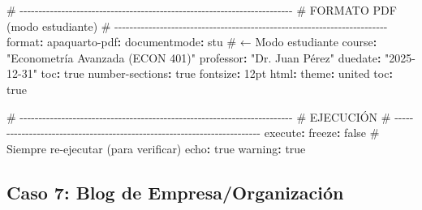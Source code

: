 \documentclass[
  doc,
  floatsintext,
  longtable,
  a4paper,
  nolmodern,
  notxfonts,
  notimes,
  12pt,
  colorlinks=true,linkcolor=blue,citecolor=blue,urlcolor=blue]{apa7}
\newenvironment{Shaded}{\begin{snugshade}}{\end{snugshade}}
\newcommand{\AttributeTok}[1]{\textcolor[rgb]{0.40,0.45,0.13}{#1}}
\newcommand{\CharTok}[1]{\textcolor[rgb]{0.13,0.47,0.30}{#1}}
\newcommand{\CommentTok}[1]{\textcolor[rgb]{0.37,0.37,0.37}{#1}}
\newcommand{\FunctionTok}[1]{\textcolor[rgb]{0.28,0.35,0.67}{#1}}
\newcommand{\KeywordTok}[1]{\textcolor[rgb]{0.00,0.23,0.31}{\textbf{#1}}}
\newcommand{\StringTok}[1]{\textcolor[rgb]{0.13,0.47,0.30}{#1}}
\begin{document}
\begin{Shaded}
\begin{Highlighting}[]
\CommentTok{\# {-}{-}{-}{-}{-}{-}{-}{-}{-}{-}{-}{-}{-}{-}{-}{-}{-}{-}{-}{-}{-}{-}{-}{-}{-}{-}{-}{-}{-}{-}{-}{-}{-}{-}{-}{-}{-}{-}{-}{-}{-}{-}{-}{-}{-}{-}{-}{-}{-}{-}{-}{-}{-}{-}{-}{-}{-}{-}{-}{-}{-}{-}{-}{-}{-}{-}{-}{-}{-}{-}{-}{-}}
\CommentTok{\# FORMATO PDF (modo estudiante)}
\CommentTok{\# {-}{-}{-}{-}{-}{-}{-}{-}{-}{-}{-}{-}{-}{-}{-}{-}{-}{-}{-}{-}{-}{-}{-}{-}{-}{-}{-}{-}{-}{-}{-}{-}{-}{-}{-}{-}{-}{-}{-}{-}{-}{-}{-}{-}{-}{-}{-}{-}{-}{-}{-}{-}{-}{-}{-}{-}{-}{-}{-}{-}{-}{-}{-}{-}{-}{-}{-}{-}{-}{-}{-}{-}}
\FunctionTok{format}\KeywordTok{:}
\AttributeTok{  }\FunctionTok{apaquarto{-}pdf}\KeywordTok{:}
\AttributeTok{    }\FunctionTok{documentmode}\KeywordTok{:}\AttributeTok{ stu}\CommentTok{       \# ← Modo estudiante}
\AttributeTok{    }\FunctionTok{course}\KeywordTok{:}\AttributeTok{ }\StringTok{"Econometría Avanzada (ECON 401)"}
\AttributeTok{    }\FunctionTok{professor}\KeywordTok{:}\AttributeTok{ }\StringTok{"Dr. Juan Pérez"}
\AttributeTok{    }\FunctionTok{duedate}\KeywordTok{:}\AttributeTok{ }\StringTok{"2025{-}12{-}31"}
\AttributeTok{    }\FunctionTok{toc}\KeywordTok{:}\AttributeTok{ }\CharTok{true}
\AttributeTok{    }\FunctionTok{number{-}sections}\KeywordTok{:}\AttributeTok{ }\CharTok{true}
\AttributeTok{    }\FunctionTok{fontsize}\KeywordTok{:}\AttributeTok{ 12pt}
\AttributeTok{    }
\AttributeTok{  }\FunctionTok{html}\KeywordTok{:}
\AttributeTok{    }\FunctionTok{theme}\KeywordTok{:}\AttributeTok{ united}
\AttributeTok{    }\FunctionTok{toc}\KeywordTok{:}\AttributeTok{ }\CharTok{true}

\CommentTok{\# {-}{-}{-}{-}{-}{-}{-}{-}{-}{-}{-}{-}{-}{-}{-}{-}{-}{-}{-}{-}{-}{-}{-}{-}{-}{-}{-}{-}{-}{-}{-}{-}{-}{-}{-}{-}{-}{-}{-}{-}{-}{-}{-}{-}{-}{-}{-}{-}{-}{-}{-}{-}{-}{-}{-}{-}{-}{-}{-}{-}{-}{-}{-}{-}{-}{-}{-}{-}{-}{-}{-}{-}}
\CommentTok{\# EJECUCIÓN}
\CommentTok{\# {-}{-}{-}{-}{-}{-}{-}{-}{-}{-}{-}{-}{-}{-}{-}{-}{-}{-}{-}{-}{-}{-}{-}{-}{-}{-}{-}{-}{-}{-}{-}{-}{-}{-}{-}{-}{-}{-}{-}{-}{-}{-}{-}{-}{-}{-}{-}{-}{-}{-}{-}{-}{-}{-}{-}{-}{-}{-}{-}{-}{-}{-}{-}{-}{-}{-}{-}{-}{-}{-}{-}{-}}
\FunctionTok{execute}\KeywordTok{:}
\AttributeTok{  }\FunctionTok{freeze}\KeywordTok{:}\AttributeTok{ }\CharTok{false}\CommentTok{             \# Siempre re{-}ejecutar (para verificar)}
\AttributeTok{  }\FunctionTok{echo}\KeywordTok{:}\AttributeTok{ }\CharTok{true}
\AttributeTok{  }\FunctionTok{warning}\KeywordTok{:}\AttributeTok{ }\CharTok{true}
\end{Highlighting}
\end{Shaded}

\subsection{Caso 7: Blog de
Empresa/Organización}\label{caso-7-blog-de-empresaorganizaciuxf3n}
\end{document}

